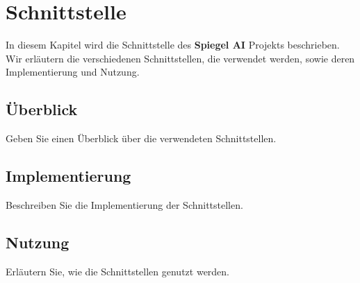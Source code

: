 \chapter{Schnittstelle}

In diesem Kapitel wird die Schnittstelle des \textbf{Spiegel AI} Projekts beschrieben. Wir erläutern die verschiedenen Schnittstellen, die verwendet werden, sowie deren Implementierung und Nutzung.

\section{Überblick}
Geben Sie einen Überblick über die verwendeten Schnittstellen.

\section{Implementierung}
Beschreiben Sie die Implementierung der Schnittstellen.

\section{Nutzung}
Erläutern Sie, wie die Schnittstellen genutzt werden.
